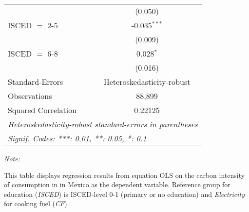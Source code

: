 \begin{table}[htbp!]
\begin{adjustbox}{width = 1\textwidth, max height = 0.95\textheight, center}
\begin{threeparttable}[b]
\begin{tabular}{lc}
                                & (0.050)\\   
            ISCED $=$ 2-5       & -0.035$^{***}$\\   
                                & (0.009)\\   
            ISCED $=$ 6-8       & 0.028$^{*}$\\   
                                & (0.016)\\   
            \midrule 
            Standard-Errors     & Heteroskedasticity-robust \\   
            Observations        & 88,899\\  
            Squared Correlation & 0.22125\\  
            \midrule \midrule
            \multicolumn{2}{l}{\emph{Heteroskedasticity-robust standard-errors in parentheses}}\\
            \multicolumn{2}{l}{\emph{Signif. Codes: ***: 0.01, **: 0.05, *: 0.1}}\\
         \end{tabular}
         
         \begin{tablenotes}\item \medskip \textit{Note:}
            \item This table displays regression results from equation OLS on the carbon intensity of consumption in  in Mexico as the dependent variable. Reference group for education (\textit{ISCED}) is ISCED-level 0-1 (primary or no education) and \textit{Electricity} for cooking fuel (\textit{CF}).
         \end{tablenotes}
      \end{threeparttable}
   \end{adjustbox}
\end{table}


